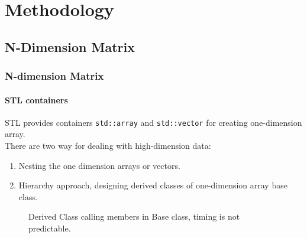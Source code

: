 \section{Methodology}

\subsection{N-Dimension Matrix}
\begin{frame}
  \frametitle{N-dimension Matrix}
  \framesubtitle{STL containers}
  STL provides containers \texttt{std::array} and \texttt{std::vector} for creating one-dimension array.
  \\
  There are two way for dealing with high-dimension data:
  \begin{enumerate}
    \item Nesting the one dimension arrays or vectors.
    \item Hierarchy approach, designing derived classes of one-dimension array base class.
  \end{enumerate}
  \begin{figure}[htbp]
    \centering
    \caption{Derived Class calling members in Base class, timing is not predictable.}
    \label{<label>}
  \end{figure}
\end{frame}


